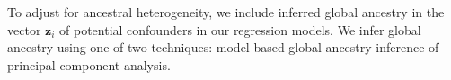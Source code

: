\documentclass[12pt]{article}
\newcommand{\add}[1]{{\color{red}{[... #1 ...]}}}
\begin{document}
To adjust for ancestral heterogeneity, we include inferred global ancestry in the vector $\mathbf{z}_i$ of potential confounders in our regression models. We infer global ancestry using one of two techniques: model-based global ancestry inference of principal component analysis. 
\add{describe which models we compare}

\add{
\begin{itemize}
\item for each of 188*2 simulated phenotypes
\item for each set of PCs
\item including 1, 4, or 10 PCs
\end{itemize}
}

%
%
\end{document}

